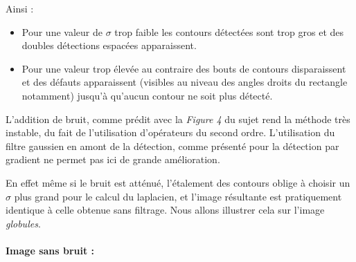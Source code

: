 \documentclass[a4,12pt]{article}
\begin{document}
Ainsi :
\begin{itemize}
	\item Pour une valeur de $\sigma$ trop faible les contours détectées sont trop gros et des doubles détections espacées apparaissent.
	\item Pour une valeur trop élevée au contraire des bouts de contours disparaissent et des défauts apparaissent (visibles au niveau des angles droits du rectangle notamment) jusqu'à qu'aucun contour ne soit plus détecté.\\
\end{itemize}


L'addition de bruit, comme prédit avec la \textit{Figure 4} du sujet rend la méthode très instable, du fait de l'utilisation d'opérateurs du second ordre. L'utilisation du filtre gaussien en amont de la détection, comme présenté pour la détection par gradient ne permet pas ici de grande amélioration.

En effet même si le bruit est atténué, l'étalement des contours oblige à choisir un $\sigma$ plus grand pour le calcul du laplacien, et l'image résultante est pratiquement identique à celle obtenue sans filtrage. Nous allons illustrer cela sur l'image \textit{globules}.\\\\

\textbf{Image sans bruit :}
\end{document}
